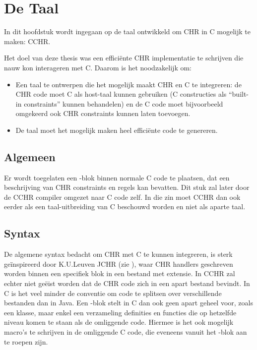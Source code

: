 \chapter{De Taal} \label{chap:taal}

In dit hoofdstuk wordt ingegaan op de taal ontwikkeld om CHR in C mogelijk te maken: CCHR.

Het doel van deze thesis was een effici\"ente CHR implementatie te schrijven die nauw kon interageren met C. Daarom is het noodzakelijk om: \begin{itemize}
  \item Een taal te ontwerpen die het mogelijk maakt CHR en C te integreren: de CHR code moet C
        als host-taal kunnen gebruiken (C constructies als ``built-in constraints'' kunnen
	behandelen) en de C code moet bijvoorbeeld omgekeerd ook CHR constraints kunnen laten toevoegen.
  \item De taal moet het mogelijk maken heel effici\"ente code te genereren.
\end{itemize}

\section{Algemeen} \label{sec:taal-gen}

Er wordt toegelaten een -blok binnen normale C code te plaatsen, dat een beschrijving van CHR constraints en regels kan bevatten. Dit stuk zal later door de CCHR compiler omgezet naar C code zelf. In die zin moet CCHR dan ook eerder als een taal-uitbreiding van C beschouwd worden en niet als aparte taal. 

\section{Syntax} \label{sec:taal-syn}

De algemene syntax bedacht om CHR met C te kunnen integreren, is sterk ge\"inspireerd door K.U.Leuven JCHR (zie \cite{peter:jchr}), waar CHR handlers geschreven worden binnen een specifiek blok in een bestand met  extensie. In CCHR zal echter niet ge\"eist worden dat de CHR code zich in een apart bestand bevindt. In C is het veel minder de conventie om code te splitsen over verschillende bestanden dan in Java. Een -blok stelt in C dan ook geen apart geheel voor, zoals een klasse, maar enkel een verzameling definities en functies die op hetzelfde niveau komen te staan als de omliggende code. Hiermee is het ook mogelijk macro's te schrijven in de omliggende C code, die eveneens vanuit het -blok aan te roepen zijn.

